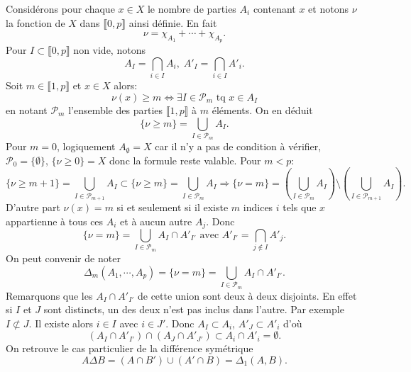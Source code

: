 \noindent Considérons pour chaque $x\in X$ le nombre de parties $A_i$ contenant $x$ et notons $\nu$ la fonction de $X$ dans $\llbracket 0, p \rrbracket$ ainsi définie. En fait
\begin{displaymath}
  \nu = \chi_{A_1} + \cdots + \chi_{A_p}.
\end{displaymath}
Pour $I \subset \llbracket 0,p \rrbracket$ non vide, notons
\begin{displaymath}
  A_I = \bigcap_{i \in I} A_i, \; A'_I = \bigcap_{i \in I} A'_i.
\end{displaymath}
Soit $m \in \llbracket 1,p\rrbracket$ et $x \in X$ alors:
\begin{displaymath}
  \nu(x) \geq m \Leftrightarrow \exists I \in \mathcal{P}_m \text{ tq } x \in A_I
\end{displaymath}
en notant $\mathcal{P}_m$ l'ensemble des parties $\llbracket 1,p \rrbracket$ à $m$ éléments. On en déduit
\begin{displaymath}
  \{ \nu \geq m \} = \bigcup_{I \in \mathcal{P}_m}A_I.
\end{displaymath}
Pour $m=0$, logiquement $A_\emptyset = X$ car il n'y a pas de condition à vérifier, $\mathcal{P}_0 = \{\emptyset\}$, $\{ \nu \geq 0 \} = X$ donc la formule reste valable.
Pour $m < p $:
\begin{displaymath}
  \{ \nu \geq m + 1 \} = \bigcup_{I \in \mathcal{P}_{m+1}}A_I \subset \{ \nu \geq m \} = \bigcup_{I \in \mathcal{P}_{m}}A_I
  \Rightarrow
  \{ \nu = m \} = \left( \bigcup_{I \in \mathcal{P}_{m}}A_I\right) \setminus \left( \bigcup_{I \in \mathcal{P}_{m+1}}A_I\right).
\end{displaymath}
D'autre part $\nu(x) = m$ si et seulement si il existe $m$ indices $i$ tels que $x$ appartienne à tous ces $A_i$ et à aucun autre $A_j$. Donc
\begin{displaymath}
  \{\nu = m\} = \bigcup_{I \in \mathcal{P}_{m}}A_I \cap A'_{I'} \text{ avec } A'_{I'} = \bigcap_{j\notin I}A'_j.
\end{displaymath}
On peut convenir de noter
\begin{displaymath}
\Delta_m(A_1,\cdots,A_p) = \{\nu = m\} = \bigcup_{I \in \mathcal{P}_{m}}A_I \cap A'_{I'}.
\end{displaymath}
Remarquons que les $A_I \cap A'_{I'}$ de cette union sont deux à deux disjoints. En effet si $I$ et $J$ sont distincts, un des deux n'est pas inclus dans l'autre. Par exemple $I \not \subset J$. Il existe alors $i\in I$ avec $i \in J'$. Donc $A_I \subset A_i$, $A'_J \subset A'_i$ d'où
\begin{displaymath}
  \left( A_I \cap A'_{I'} \right) \cap \left( A_J \cap A'_{J'} \right) \subset A_i \cap A'_i = \emptyset.
\end{displaymath}
On retrouve le cas particulier de la différence symétrique
\begin{displaymath}
  A \Delta B = (A\cap B') \cup (A' \cap B) = \Delta_1(A,B).
\end{displaymath}

